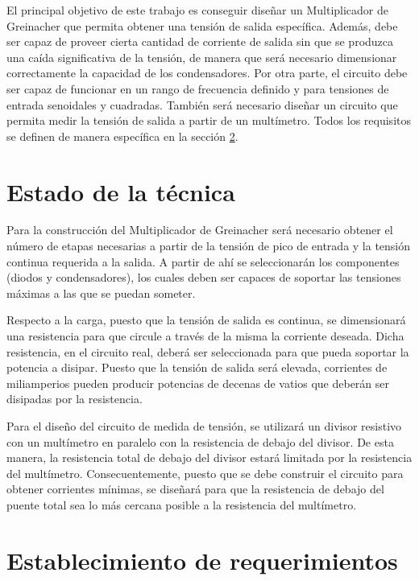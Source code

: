 El principal objetivo de este trabajo es conseguir diseñar un Multiplicador de Greinacher que permita obtener una tensión de salida específica.
Además, debe ser capaz de proveer cierta cantidad de corriente de salida sin que se produzca una caída significativa de la tensión, de manera que será
necesario dimensionar correctamente la capacidad de los condensadores. Por otra parte, el circuito debe ser capaz de funcionar en un rango de frecuencia definido
y para tensiones de entrada senoidales y cuadradas. También será necesario diseñar un circuito que permita medir la tensión de salida a partir de un multímetro.
Todos los requisitos se definen de manera específica en la sección \ref{requisitos}.

\section{Estado de la técnica}

Para la construcción del Multiplicador de Greinacher será necesario obtener el número de etapas necesarias a partir de la tensión de pico de entrada y
la tensión continua requerida a la salida. A partir de ahí se seleccionarán los componentes (diodos y condensadores), los cuales deben ser capaces de soportar las tensiones máximas
a las que se puedan someter.

Respecto a la carga, puesto que la tensión de salida es continua, se dimensionará una resistencia para que circule a través de la misma la corriente deseada.
Dicha resistencia, en el circuito real, deberá ser seleccionada para que pueda soportar la potencia a disipar. Puesto que la tensión de salida será elevada,
corrientes de miliamperios pueden producir potencias de decenas de vatios que deberán ser disipadas por la resistencia.

Para el diseño del circuito de medida de tensión, se utilizará un divisor resistivo con un multímetro en paralelo con la resistencia de debajo del divisor.
De esta manera, la resistencia total de debajo del divisor estará limitada por la resistencia del multímetro. Consecuentemente, puesto
que se debe construir el circuito para obtener corrientes mínimas, se diseñará para que la resistencia de debajo del puente total sea lo más cercana posible a la
resistencia del multímetro.

\section{Establecimiento de requerimientos} \label{requisitos}